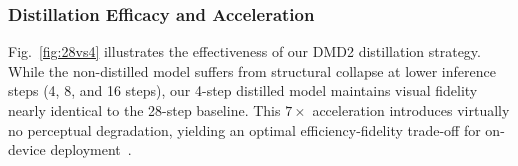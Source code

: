 \subsubsection{Distillation Efficacy and Acceleration}
Fig.~\ref{fig:28vs4} illustrates the effectiveness of our DMD2 distillation strategy.
While the non-distilled model suffers from structural collapse at lower inference steps (4, 8, and 16 steps), our 4-step distilled model maintains visual fidelity nearly identical to the 28-step baseline.
This $7\times$ acceleration introduces virtually no perceptual degradation, yielding an optimal efficiency-fidelity trade-off for on-device deployment~\cite{yin2024improved_dmd,luo2023lcm}.

